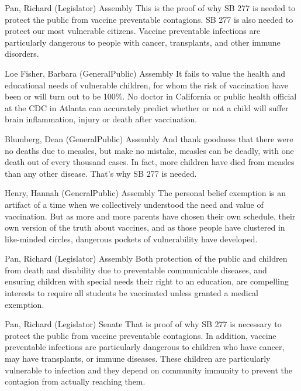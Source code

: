 \begin{result}{12.399020835139504}{Pan, Richard (Legislator) Assembly}
This is the proof of why SB 277 is needed to protect the public from vaccine preventable contagions. SB 277 is also needed to protect our most vulnerable citizens. Vaccine preventable infections are particularly dangerous to people with cancer, transplants, and other immune disorders.
\end{result}

\begin{result}{11.715124538755342}{Loe Fisher, Barbara (GeneralPublic) Assembly}
It fails to value the health and educational needs of vulnerable children, for whom the risk of vaccination have been or will turn out to be 100\%. No doctor in California or public health official at the CDC in Atlanta can accurately predict whether or not a child will suffer brain inflammation, injury or death after vaccination.
\end{result}

\begin{result}{10.650676879567987}{Blumberg, Dean (GeneralPublic) Assembly}
And thank goodness that there were no deaths due to measles, but make no mistake, measles can be deadly, with one death out of every thousand cases. In fact, more children have died from measles than any other disease. That's why SB 277 is needed.
\end{result}

\begin{result}{10.277112279676443}{Henry, Hannah (GeneralPublic) Assembly}
The personal belief exemption is an artifact of a time when we collectively understood the need and value of vaccination. But as more and more parents have chosen their own schedule, their own version of the truth about vaccines, and as those people have clustered in like-minded circles, dangerous pockets of vulnerability have developed.
\end{result}

\begin{result}{9.180445533243097}{Pan, Richard (Legislator) Assembly}
Both protection of the public and children from death and disability due to preventable communicable diseases, and ensuring children with special needs their right to an education, are compelling interests to require all students be vaccinated unless granted a medical exemption.
\end{result}

\begin{result}{9.135690999540271}{Pan, Richard (Legislator) Senate}
That is proof of why SB 277 is necessary to protect the public from vaccine preventable contagions. In addition, vaccine preventable infections are particularly dangerous to children who have cancer, may have transplants, or immune diseases. These children are particularly vulnerable to infection and they depend on community immunity to prevent the contagion from actually reaching them.
\end{result}

